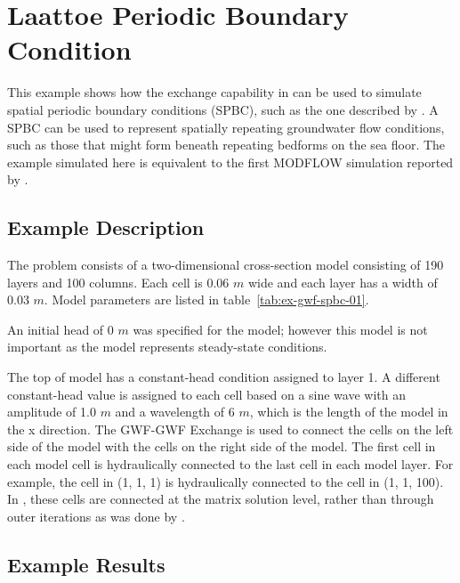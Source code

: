 \section{Laattoe Periodic Boundary Condition}

This example shows how the exchange capability in \mf can be used to simulate spatial periodic boundary conditions (SPBC), such as the one described by \cite{laattoe2014spatial}.  A SPBC can be used to represent spatially repeating groundwater flow conditions, such as those that might form beneath repeating bedforms on the sea floor.  The example simulated here is equivalent to the first MODFLOW simulation reported by \cite{laattoe2014spatial}.  

\subsection{Example Description}

The problem consists of a two-dimensional cross-section model consisting of 190 layers and 100 columns.  Each cell is 0.06 $m$ wide and each layer has a width of 0.03 $m$.  Model parameters are listed in table~\ref{tab:ex-gwf-spbc-01}. 



An initial head of 0 $m$ was specified for the model; however this model is not important as the model represents steady-state conditions.

The top of model has a constant-head condition assigned to layer 1.  A different constant-head value is assigned to each cell based on a sine wave with an amplitude of 1.0 $m$ and a wavelength of 6 $m$, which is the length of the model in the x direction.  The GWF-GWF Exchange is used to connect the cells on the left side of the model with the cells on the right side of the model.  The first cell in each model cell is hydraulically connected to the last cell in each model layer.  For example, the cell in (1, 1, 1) is hydraulically connected to the cell in (1, 1, 100).  In \mf, these cells are connected at the matrix solution level, rather than through outer iterations as was done by \cite{laattoe2014spatial}.  

\subsection{Example Results}

